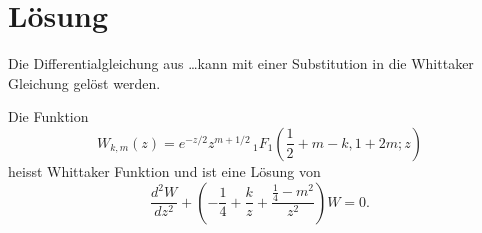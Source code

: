 %
%
%
\section{Lösung
\label{parzyl:section:teil1}}
Die Differentialgleichung aus \dots kann mit einer Substitution
in die Whittaker Gleichung gelöst werden.
\begin{definition}
    Die Funktion 
    \begin{equation*}
        W_{k,m}(z) = 
    e^{-z/2} z^{m+1/2} \,
    {}_{1} F_{1}(\frac{1}{2} + m - k, 1 + 2m; z)
    \end{equation*}
    heisst Whittaker Funktion und ist eine Lösung
    von
    \begin{equation}
        \frac{d^2W}{d z^2} +
        \left(-\frac{1}{4}  + \frac{k}{z} + \frac{\frac{1}{4} - m^2}{z^2} \right) W = 0.
    \end{equation}
\end{definition}



